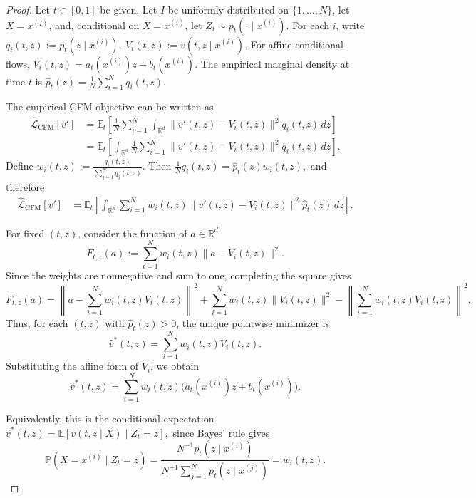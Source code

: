 \documentclass[a4paper,11pt]{article}
\theoremstyle{plain}
\theoremstyle{definition}
\begin{document}
\begin{proof}
Let $t \in [0,1]$ be given.
Let \(I\) be uniformly distributed on \(\{1,\ldots,N\}\), let
\(X=x^{(I)}\), and, conditional on \(X=x^{(i)}\), let
\(Z_t\sim p_t(\cdot\mid x^{(i)})\). For each \(i\), write
\(
    q_i(t,z):=p_t(z\mid x^{(i)}),
    \ 
    V_i(t,z):=v(t,z\mid x^{(i)}).
\)
For affine conditional flows,
\(
    V_i(t,z)=a_t(x^{(i)})z+b_t(x^{(i)}).
\)
The empirical marginal density at time \(t\) is
\(
    \hat p_t(z)=\frac1N\sum_{i=1}^N q_i(t,z).
\)

The empirical CFM objective can be written as
\[
\begin{aligned}
    \widehat{\mathcal L}_{\mathrm{CFM}}[v']
    &=
    \mathbb E_t\left[
    \frac1N\sum_{i=1}^N
    \int_{\mathbb R^d}
    \|v'(t,z)-V_i(t,z)\|^2 q_i(t,z)\,dz
    \right]  \\
    &=
    \mathbb E_t\left[
    \int_{\mathbb R^d}
    \frac1N\sum_{i=1}^N
    \|v'(t,z)-V_i(t,z)\|^2 q_i(t,z)\,dz
    \right].
\end{aligned}
\]
Define
\(
    w_i(t,z)
    :=
    \frac{q_i(t,z)}
    {\sum_{j=1}^N q_j(t,z)}.
\)
Then
\(
    \frac1N q_i(t,z)
    =
    \hat p_t(z)w_i(t,z),
\)
and therefore
\[
\begin{aligned}
    \widehat{\mathcal L}_{\mathrm{CFM}}[v']
    &=
    \mathbb E_t\left[
    \int_{\mathbb R^d}
    \sum_{i=1}^N
    w_i(t,z)\|v'(t,z)-V_i(t,z)\|^2
    \hat p_t(z)\,dz
    \right].
\end{aligned}
\]

For fixed \((t,z)\), consider the function of \(a\in\mathbb R^d\)
\[
    F_{t,z}(a)
    :=
    \sum_{i=1}^N w_i(t,z)\|a-V_i(t,z)\|^2.
\]
Since the weights are nonnegative and sum to one, completing the square gives
\[
    F_{t,z}(a)
    =
    \left\|a-\sum_{i=1}^N w_i(t,z)V_i(t,z)\right\|^2
    +
    \sum_{i=1}^N w_i(t,z)\|V_i(t,z)\|^2
    -
    \left\|\sum_{i=1}^N w_i(t,z)V_i(t,z)\right\|^2.
\]
Thus, for each \((t,z)\) with \(\hat p_t(z)>0\), the unique pointwise minimizer is
\[
    \hat v^\ast(t,z)
    =
    \sum_{i=1}^N w_i(t,z)V_i(t,z).
\]
Substituting the affine form of \(V_i\), we obtain
\[
    \hat v^\ast(t,z)
    =
    \sum_{i=1}^N
    w_i(t,z)\bigl(a_t(x^{(i)})z+b_t(x^{(i)})\bigr).
\]

Equivalently, this is the conditional expectation
\(
    \hat v^\ast(t,z)
    =
    \mathbb E[v(t,z\mid X)\mid Z_t=z],
\)
since Bayes' rule gives
\[
    \mathbb P(X=x^{(i)}\mid Z_t=z)
    =
    \frac{N^{-1}p_t(z\mid x^{(i)})}
    {N^{-1}\sum_{j=1}^N p_t(z\mid x^{(j)})}
    =
    w_i(t,z).
\]


\end{proof}
\end{document}
